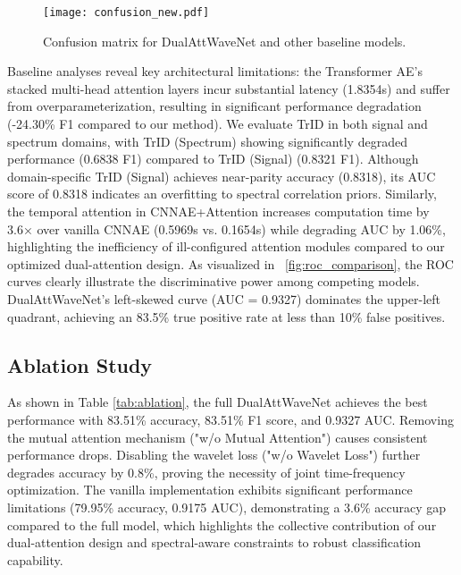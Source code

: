 \documentclass[conference]{IEEEtran}
\begin{document}
\begin{figure}
    \centering
    \texttt{[image: confusion\_new.pdf]}
    \caption{Confusion matrix for DualAttWaveNet and other baseline models.}
    \label{fig:confusion_matrix}
\end{figure}

Baseline analyses reveal key architectural limitations: the Transformer AE's stacked multi-head attention layers incur substantial latency (1.8354s) and suffer from overparameterization, resulting in significant performance degradation (-24.30\% F1 compared to our method). We evaluate TrID in both signal and spectrum domains, with TrID (Spectrum) showing significantly degraded performance (0.6838 F1) compared to TrID (Signal) (0.8321 F1). Although domain-specific TrID (Signal) achieves near-parity accuracy (0.8318), its AUC score of 0.8318 indicates an overfitting to spectral correlation priors. Similarly, the temporal attention in CNNAE+Attention increases computation time by 3.6× over vanilla CNNAE (0.5969s vs. 0.1654s) while degrading AUC by 1.06\%, highlighting the inefficiency of ill-configured attention modules compared to our optimized dual-attention design. As visualized in \figurename~\ref{fig:roc_comparison}, the ROC curves clearly illustrate the discriminative power among competing models. DualAttWaveNet's left-skewed curve (AUC = 0.9327) dominates the upper-left quadrant, achieving an 83.5\% true positive rate at less than 10\% false positives. 


\subsection{Ablation Study}

As shown in Table \ref{tab:ablation}, the full DualAttWaveNet achieves the best performance with 83.51\% accuracy, 83.51\% F1 score, and 0.9327 AUC. Removing the mutual attention mechanism ("w/o Mutual Attention") causes consistent performance drops. Disabling the wavelet loss ("w/o Wavelet Loss") further degrades accuracy by 0.8\%, proving the necessity of joint time-frequency optimization. The vanilla implementation exhibits significant performance limitations (79.95\% accuracy, 0.9175 AUC), demonstrating a 3.6\% accuracy gap compared to the full model, which highlights the collective contribution of our dual-attention design and spectral-aware constraints to robust classification capability.
\end{document}
